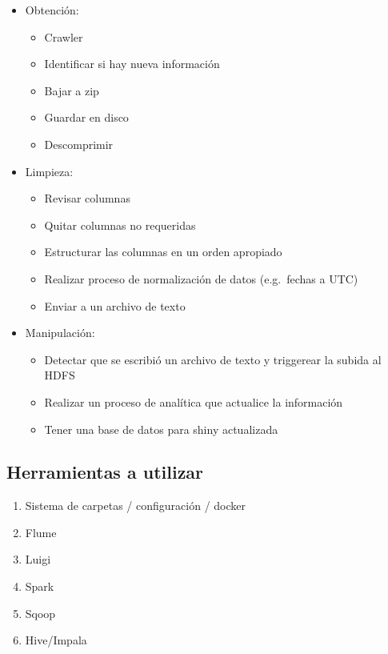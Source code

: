 \documentclass[]{article}
\begin{document}
\begin{itemize}
\itemsep1pt\parskip0pt
\item
  Obtención:

  \begin{itemize}
  \itemsep1pt\parskip0pt
  \item
    Crawler
  \item
    Identificar si hay nueva información
  \item
    Bajar a zip
  \item
    Guardar en disco
  \item
    Descomprimir
  \end{itemize}
\item
  Limpieza:

  \begin{itemize}
  \itemsep1pt\parskip0pt
  \item
    Revisar columnas
  \item
    Quitar columnas no requeridas
  \item
    Estructurar las columnas en un orden apropiado
  \item
    Realizar proceso de normalización de datos (e.g.~fechas a UTC)
  \item
    Enviar a un archivo de texto
  \end{itemize}
\item
  Manipulación:

  \begin{itemize}
  \itemsep1pt\parskip0pt
  \item
    Detectar que se escribió un archivo de texto y triggerear la subida
    al HDFS
  \item
    Realizar un proceso de analítica que actualice la información
  \item
    Tener una base de datos para shiny actualizada
  \end{itemize}
\end{itemize}

\subsection{Herramientas a utilizar}\label{herramientas-a-utilizar}

\begin{enumerate}
\def\labelenumi{\arabic{enumi}.}
\itemsep1pt\parskip0pt
\item
  Sistema de carpetas / configuración / docker
\item
  Flume
\item
  Luigi
\item
  Spark
\item
  Sqoop
\item
  Hive/Impala
\end{enumerate}
\end{document}
